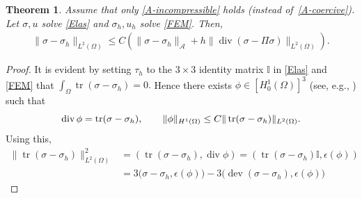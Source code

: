 \documentclass[12pt]{amsart}
\numberwithin{equation}{section}
\DeclareMathOperator{\dev}{dev}
\newtheorem{theorem}{Theorem}[section]
\theoremstyle{definition}
\theoremstyle{remark}
\newcommand{\om}{{\Omega}}
\renewcommand{\(}{\bigl(}
\renewcommand{\)}{\bigr)}
\renewcommand\div{\operatorname{div}}
\newcommand\tr{\operatorname{tr}}
\newcommand{\dive}{{\ensuremath\mathop{\mathrm{div}\,}}} %
\newcommand{\Aa}{\mathcal{A}}
\begin{document}
\begin{theorem}
  \label{thm:ee-robust}
  Assume that only \eqref{A-incompressible} holds (instead of~\eqref{A-coercive}).
  Let $\sigma, u$ solve \eqref{Elas} and $\sigma_h, u_h$ solve \eqref{FEM}. Then, 
    \begin{align}\label{error:sigma-incompressible}
        \|\sigma-\sigma_h\|_{L^2(\Omega)} \le C ( \|\sigma-\sigma_h\|_{\Aa} + h \|\div (\sigma - \Pi \sigma) \|_{L^2(\Omega)}). 
    \end{align}
\end{theorem}
\begin{proof}
It is evident by setting $\tau_h$ to the $3 \times 3$ identity matrix
$\mathbb{I}$ in \eqref{Elas} and \eqref{FEM} that
$\int_{\Omega}\tr (\sigma - {\sigma}_h) =0.$
Hence there exists $\phi \in [H_0^1(\Omega)]^3$  (see, e.g., \cite{costabel2010bogovskiui}) such that
\begin{equation}
  \label{eq:phi-tr}
  \dive \phi = \tr (\sigma - \sigma_h), \qquad
  \| \phi \|_{H^1(\Omega)} \le C \| \tr(\sigma - \sigma_h)\|_{L^2(\Omega)}.
\end{equation}
Using this, 
\begin{equation}
  \label{eq:tr-id}
\begin{aligned}
  \|\tr(\sigma - {\sigma}_h)\|_{L^2(\Omega)}^2
  &= (\tr(\sigma - {\sigma}_h), \div \phi) 
  =  ( \tr(\sigma - {\sigma}_h) \mathbb{I},  \epsilon(\phi))
  \\ %
  &= 3 \big(\sigma - {\sigma}_h, \epsilon(\phi) \big)
 - 3(\dev(\sigma - {\sigma}_h),    \epsilon(\phi) \big)

\end{aligned}
\end{equation}
\end{proof}
\end{document}
